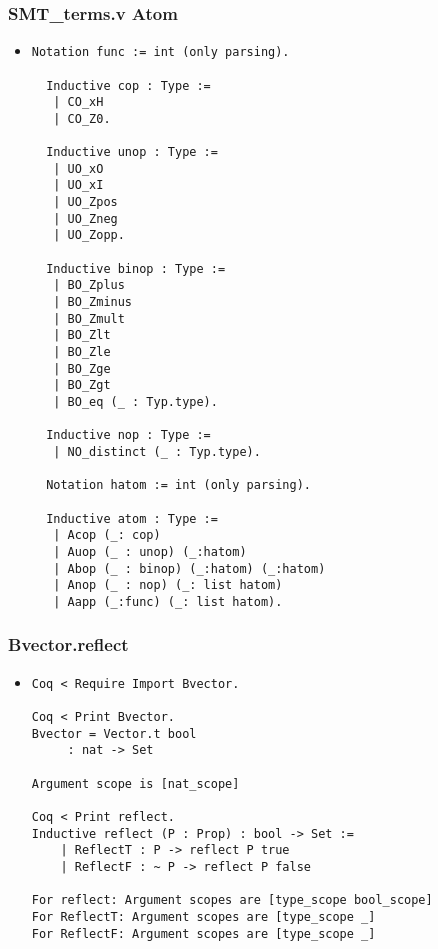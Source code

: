 \documentclass{beamer}
\begin{document}
\begin{frame}[fragile]
\frametitle{SMT\_terms.v Atom}
\begin{itemize}
\item
\begin{Verbatim}[fontsize=\tiny]
  Notation func := int (only parsing).

  Inductive cop : Type := 
   | CO_xH
   | CO_Z0.

  Inductive unop : Type :=
   | UO_xO
   | UO_xI
   | UO_Zpos
   | UO_Zneg
   | UO_Zopp.

  Inductive binop : Type :=
   | BO_Zplus
   | BO_Zminus
   | BO_Zmult
   | BO_Zlt
   | BO_Zle
   | BO_Zge
   | BO_Zgt
   | BO_eq (_ : Typ.type).

  Inductive nop : Type :=
   | NO_distinct (_ : Typ.type).

  Notation hatom := int (only parsing).

  Inductive atom : Type :=
   | Acop (_: cop)
   | Auop (_ : unop) (_:hatom)
   | Abop (_ : binop) (_:hatom) (_:hatom)
   | Anop (_ : nop) (_: list hatom)
   | Aapp (_:func) (_: list hatom).
\end{Verbatim}
\end{itemize}
\end{frame}

\begin{frame}[fragile]
\frametitle{Bvector.reflect}
\begin{itemize}
\item
\begin{Verbatim}[fontsize=\small]
Coq < Require Import Bvector.

Coq < Print Bvector.
Bvector = Vector.t bool
     : nat -> Set

Argument scope is [nat_scope]

Coq < Print reflect.
Inductive reflect (P : Prop) : bool -> Set :=
    | ReflectT : P -> reflect P true
    | ReflectF : ~ P -> reflect P false

For reflect: Argument scopes are [type_scope bool_scope]
For ReflectT: Argument scopes are [type_scope _]
For ReflectF: Argument scopes are [type_scope _]
\end{Verbatim}
\end{itemize}
\end{frame}
\end{document}
